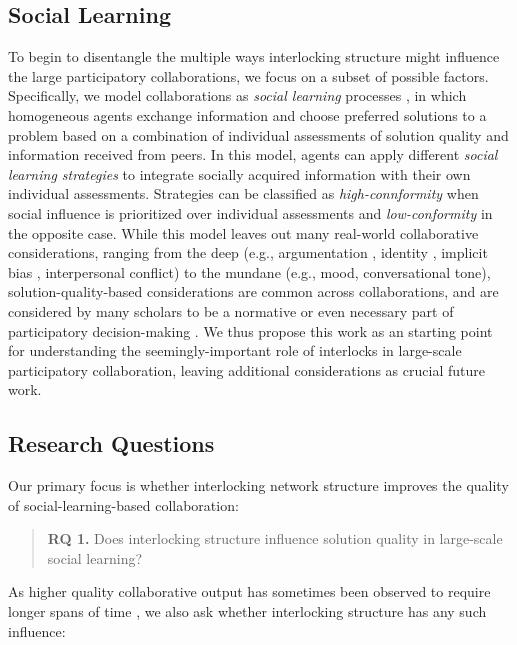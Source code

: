 \documentclass[manuscript,screen,review,acmsmall]{acmart}
\begin{document}
\subsection{Social Learning}
To begin to disentangle the multiple ways interlocking structure might influence the large participatory collaborations,
we focus on a subset of possible factors.
Specifically, we model collaborations as {\em social learning} processes \cite{barkoczi_social_2016, mason_collaborative_2012, hong_interpreted_2009, degroot_reaching_1974},
in which homogeneous agents exchange information and choose preferred solutions to a problem based on a combination of individual assessments of solution quality and information received from peers.
In this model, agents can apply different
{\em social learning strategies} to integrate socially acquired information with their own individual assessments.
Strategies can be classified as {\em high-connformity} when social influence is prioritized over individual assessments and {\em low-conformity} in the opposite case.
While this model leaves out many real-world collaborative considerations,
ranging from the deep
(e.g.,
argumentation \cite{fishkin_voice_1997, mansbridge_minimalist_2015},
identity \cite{bail_breaking_2022,schkade_what_2007},
implicit bias \cite{amodio_stereotyping_2006},
interpersonal conflict\cite{whiting_did_2019})
to the mundane (e.g.,
mood, 
conversational tone),
solution-quality-based considerations are common across collaborations,
and are considered by many scholars to be a normative or even necessary
part of participatory decision-making
\cite{mansbridge_minimalist_2015}.
We thus propose this work as an starting point for understanding the seemingly-important role of interlocks in large-scale participatory collaboration, leaving additional considerations as crucial future work.

\subsection{Research Questions}
Our primary focus is whether interlocking network structure improves the quality of social-learning-based collaboration:
\begin{quote}
{\bfseries RQ 1.} Does interlocking structure influence solution quality in large-scale social learning?
\end{quote}

As higher quality collaborative output has sometimes been observed to require longer spans of time
\cite{
gentry_consensus_1982,
platt_network_2018},
we also ask whether interlocking structure
has any such influence:
\end{document}
